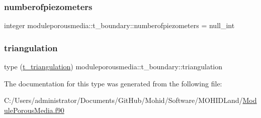 \mbox{\label{structmoduleporousmedia_1_1t__boundary_ae52354fd7e4dd22f2b3089335bed0bc6}} 
\subsubsection{\texorpdfstring{numberofpiezometers}{numberofpiezometers}}
{\footnotesize\ttfamily integer moduleporousmedia\+::t\+\_\+boundary\+::numberofpiezometers = null\+\_\+int\hspace{0.3cm}{\ttfamily [private]}}

\mbox{\label{structmoduleporousmedia_1_1t__boundary_a5e2bc2b42b6d607521ce8b894878f55b}} 
\subsubsection{\texorpdfstring{triangulation}{triangulation}}
{\footnotesize\ttfamily type (\mbox{\hyperlink{structmoduleporousmedia_1_1t__triangulation}{t\+\_\+triangulation}}) moduleporousmedia\+::t\+\_\+boundary\+::triangulation\hspace{0.3cm}{\ttfamily [private]}}



The documentation for this type was generated from the following file\+:\begin{DoxyCompactItemize}
\item 
C\+:/\+Users/administrator/\+Documents/\+Git\+Hub/\+Mohid/\+Software/\+M\+O\+H\+I\+D\+Land/\mbox{\hyperlink{_module_porous_media_8f90}{Module\+Porous\+Media.\+f90}}\end{DoxyCompactItemize}
